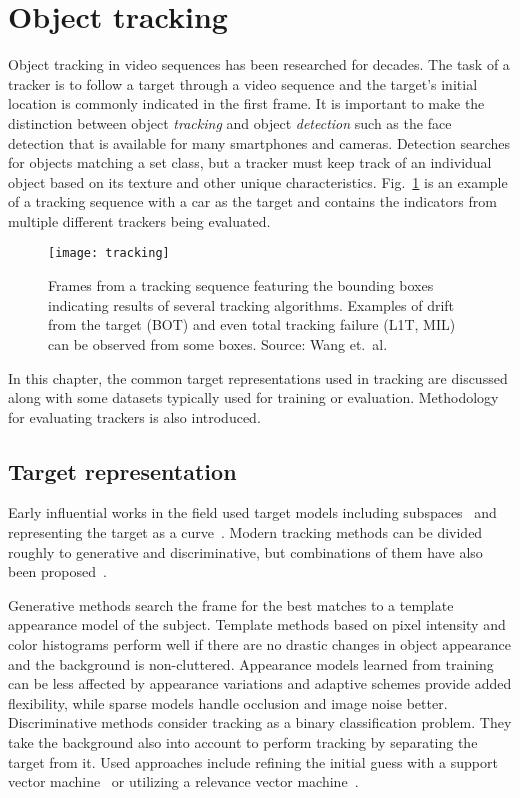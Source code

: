 \section{Object tracking}
Object tracking in video sequences has been researched for decades. The task of a tracker is to follow a target through a video sequence and the target's initial location is commonly indicated in the first frame. It is important to make the distinction between object \textit{tracking} and object \textit{detection} such as the face detection that is available for many smartphones and cameras. Detection searches for objects matching a set class, but a tracker must keep track of an individual object based on its texture and other unique characteristics. Fig.~\ref{fig:tracking} is an example of a tracking sequence with a car as the target and contains the indicators from multiple different trackers being evaluated.

\begin{figure}[H]
\centering
\texttt{[image: tracking]}
\caption{Frames from a tracking sequence featuring the bounding boxes indicating results of several tracking algorithms. Examples of drift from the target (BOT) and even total tracking failure (L1T, MIL) can be observed from some boxes. Source: Wang et.~al.~\cite{OBJECT_PLS}}\label{fig:tracking}
\end{figure}

In this chapter, the common target representations used in tracking are discussed along with some datasets typically used for training or evaluation. Methodology for evaluating trackers is also introduced.

\subsection{Target representation}
Early influential works in the field used target models including subspaces~\cite{EIGENTRACK} and representing the target as a curve~\cite{CONDENSATION}. Modern tracking methods can be divided roughly to generative and discriminative, but combinations of them have also been proposed~\cite{DLT}.

Generative methods search the frame for the best matches to a template appearance model of the subject. Template methods based on pixel intensity and color histograms perform well if there are no drastic changes in object appearance and the background is non-cluttered. Appearance models learned from training can be less affected by appearance variations and adaptive schemes provide added flexibility, while sparse models handle occlusion and image noise better.~\cite{OBJECT_PLS} Discriminative methods consider tracking as a binary classification problem. They take the background also into account to perform tracking by separating the target from it. Used approaches include refining the initial guess with a support vector machine~\cite{SVT} or utilizing a relevance vector machine~\cite{SPARSE_BAYESIAN}.


